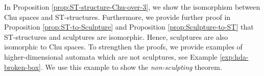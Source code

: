        In Proposition \ref{prop:ST-structure-Chu-over-3}, we show the isomorphism between Chu spaces and ST-structures. Furthermore, we provide further proof in Proposition \ref{prop:ST-to-Sculpture} and Proposition \ref{prop:Sculpture-to-ST} that ST-structures and sculptures are isomorphic. Hence, sculptures are also isomorphic to Chu spaces. To strengthen the proofs, we provide examples of higher-dimensional automata which are not sculptures, see Example \ref{exp:hda-broken-box}. We use this example to show the \emph{non-sculpting} theorem.
        